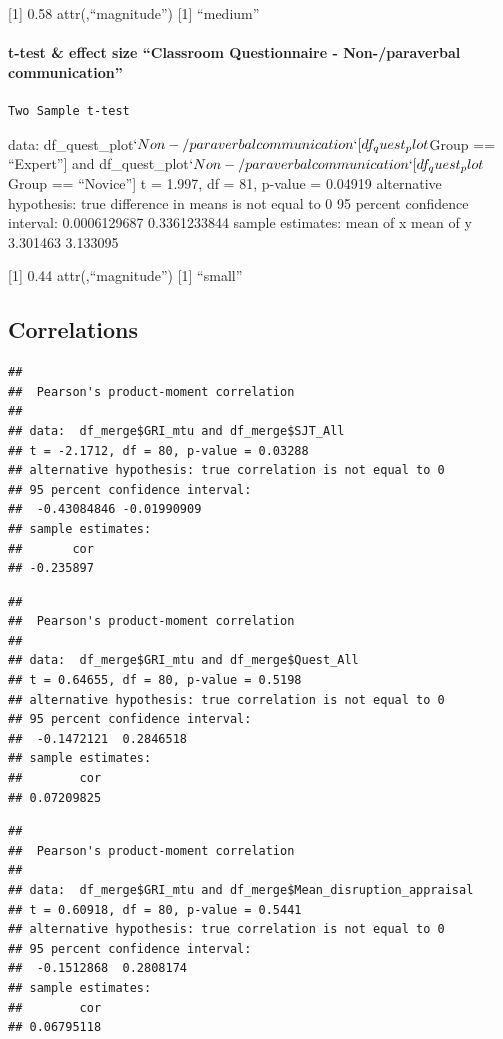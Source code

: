 \documentclass[
]{article}
\begin{document}
{[}1{]} 0.58 attr(,``magnitude'') {[}1{]} ``medium''

\paragraph{t-test \& effect size ``Classroom Questionnaire -
Non-/paraverbal
communication''}\label{t-test-effect-size-classroom-questionnaire---non-paraverbal-communication}

\begin{verbatim}
Two Sample t-test
\end{verbatim}

data:
df\_quest\_plot\(`Non-/paraverbal communication`[df_quest_plot\)Group ==
``Expert''{]} and
df\_quest\_plot\(`Non-/paraverbal communication`[df_quest_plot\)Group ==
``Novice''{]} t = 1.997, df = 81, p-value = 0.04919 alternative
hypothesis: true difference in means is not equal to 0 95 percent
confidence interval: 0.0006129687 0.3361233844 sample estimates: mean of
x mean of y 3.301463 3.133095

{[}1{]} 0.44 attr(,``magnitude'') {[}1{]} ``small''

\subsection{Correlations}\label{correlations}

\begin{verbatim}
## 
##  Pearson's product-moment correlation
## 
## data:  df_merge$GRI_mtu and df_merge$SJT_All
## t = -2.1712, df = 80, p-value = 0.03288
## alternative hypothesis: true correlation is not equal to 0
## 95 percent confidence interval:
##  -0.43084846 -0.01990909
## sample estimates:
##       cor 
## -0.235897
\end{verbatim}

\begin{verbatim}
## 
##  Pearson's product-moment correlation
## 
## data:  df_merge$GRI_mtu and df_merge$Quest_All
## t = 0.64655, df = 80, p-value = 0.5198
## alternative hypothesis: true correlation is not equal to 0
## 95 percent confidence interval:
##  -0.1472121  0.2846518
## sample estimates:
##        cor 
## 0.07209825
\end{verbatim}

\begin{verbatim}
## 
##  Pearson's product-moment correlation
## 
## data:  df_merge$GRI_mtu and df_merge$Mean_disruption_appraisal
## t = 0.60918, df = 80, p-value = 0.5441
## alternative hypothesis: true correlation is not equal to 0
## 95 percent confidence interval:
##  -0.1512868  0.2808174
## sample estimates:
##        cor 
## 0.06795118
\end{verbatim}
\end{document}
